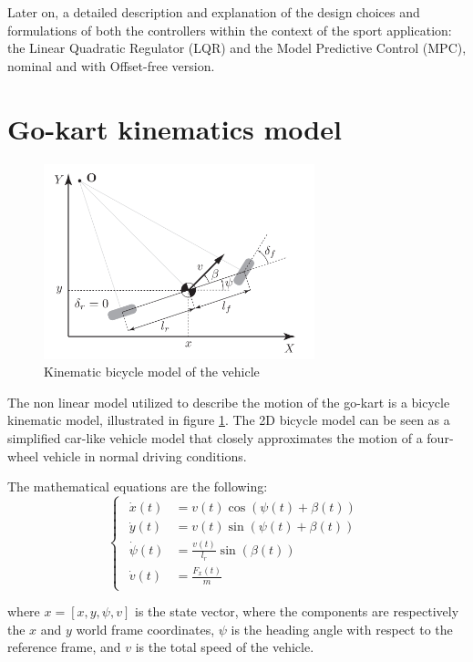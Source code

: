 \documentclass[a4paper,12pt,oneside]{book}
\begin{document}
Later on, a detailed description and explanation of the design choices and formulations of both the controllers within the context of the sport application: the Linear Quadratic Regulator (LQR) and the Model Predictive Control (MPC), nominal and with Offset-free version.

\section{Go-kart kinematics model}
\begin{figure}[h!]
	\centering
	\includegraphics[width=0.7\textwidth]{Bycicle_scheme.png}
\caption{Kinematic bicycle model of the vehicle}
\label{Kinematic_bicycle}
\end{figure}
The non linear model utilized to describe the motion of the go-kart is a bicycle kinematic model, illustrated in figure \ref{Kinematic_bicycle}.
The 2D bicycle model can be seen as a simplified car-like vehicle model that closely approximates the motion of a four-wheel vehicle in normal driving conditions.

The mathematical equations are the following:
\begin{equation}
\begin{cases}
 	\begin{aligned}
		\dot{x}(t) &= v(t) \cos(\psi(t) + \beta(t)) \\
		\dot{y}(t) &= v(t) \sin(\psi(t) + \beta(t)) \\
		\dot{\psi}(t) &= \frac{v(t)}{l_r} \sin(\beta(t)) \\
		\dot{v}(t) &= \frac{F_x(t)}{m} 
	\end{aligned}
\end{cases}
\label{Plant}
\end{equation}

where $x = [x, y, \psi, v]$ is the state vector, where the components are respectively the $x$ and $y$ world frame coordinates, $\psi$ is the heading angle with respect to the reference frame, and $v$ is the total speed of the vehicle.
\end{document}
